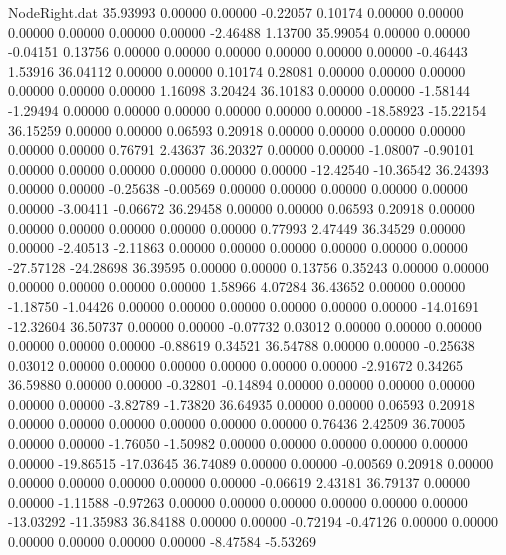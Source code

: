 \begin{filecontents}{NodeRight.dat}
  35.93993    0.00000    0.00000    -0.22057    0.10174    0.00000    0.00000    0.00000    0.00000    0.00000    0.00000   -2.46488    1.13700
  35.99054    0.00000    0.00000    -0.04151    0.13756    0.00000    0.00000    0.00000    0.00000    0.00000    0.00000   -0.46443    1.53916
  36.04112    0.00000    0.00000     0.10174    0.28081    0.00000    0.00000    0.00000    0.00000    0.00000    0.00000    1.16098    3.20424
  36.10183    0.00000    0.00000    -1.58144   -1.29494    0.00000    0.00000    0.00000    0.00000    0.00000    0.00000  -18.58923  -15.22154
  36.15259    0.00000    0.00000     0.06593    0.20918    0.00000    0.00000    0.00000    0.00000    0.00000    0.00000    0.76791    2.43637
  36.20327    0.00000    0.00000    -1.08007   -0.90101    0.00000    0.00000    0.00000    0.00000    0.00000    0.00000  -12.42540  -10.36542
  36.24393    0.00000    0.00000    -0.25638   -0.00569    0.00000    0.00000    0.00000    0.00000    0.00000    0.00000   -3.00411   -0.06672
  36.29458    0.00000    0.00000     0.06593    0.20918    0.00000    0.00000    0.00000    0.00000    0.00000    0.00000    0.77993    2.47449
  36.34529    0.00000    0.00000    -2.40513   -2.11863    0.00000    0.00000    0.00000    0.00000    0.00000    0.00000  -27.57128  -24.28698
  36.39595    0.00000    0.00000     0.13756    0.35243    0.00000    0.00000    0.00000    0.00000    0.00000    0.00000    1.58966    4.07284
  36.43652    0.00000    0.00000    -1.18750   -1.04426    0.00000    0.00000    0.00000    0.00000    0.00000    0.00000  -14.01691  -12.32604
  36.50737    0.00000    0.00000    -0.07732    0.03012    0.00000    0.00000    0.00000    0.00000    0.00000    0.00000   -0.88619    0.34521
  36.54788    0.00000    0.00000    -0.25638    0.03012    0.00000    0.00000    0.00000    0.00000    0.00000    0.00000   -2.91672    0.34265
  36.59880    0.00000    0.00000    -0.32801   -0.14894    0.00000    0.00000    0.00000    0.00000    0.00000    0.00000   -3.82789   -1.73820
  36.64935    0.00000    0.00000     0.06593    0.20918    0.00000    0.00000    0.00000    0.00000    0.00000    0.00000    0.76436    2.42509
  36.70005    0.00000    0.00000    -1.76050   -1.50982    0.00000    0.00000    0.00000    0.00000    0.00000    0.00000  -19.86515  -17.03645
  36.74089    0.00000    0.00000    -0.00569    0.20918    0.00000    0.00000    0.00000    0.00000    0.00000    0.00000   -0.06619    2.43181
  36.79137    0.00000    0.00000    -1.11588   -0.97263    0.00000    0.00000    0.00000    0.00000    0.00000    0.00000  -13.03292  -11.35983
  36.84188    0.00000    0.00000    -0.72194   -0.47126    0.00000    0.00000    0.00000    0.00000    0.00000    0.00000   -8.47584   -5.53269

\end{filecontents}
